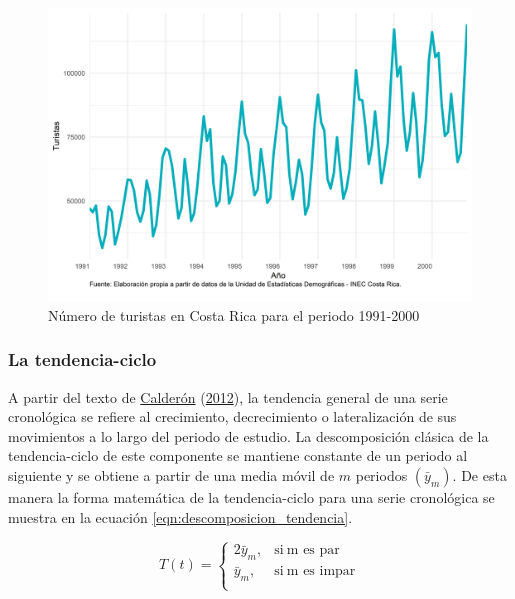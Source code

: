 \documentclass[
]{article}
\begin{document}
\begin{figure}[!h]
\includegraphics[width=1\linewidth,height=1\textheight]{Tesis_files/figure-latex/ejemplo_multiplicativa-1} \caption{Número de turistas en Costa Rica para el periodo 1991-2000}\label{fig:ejemplo_multiplicativa}
\end{figure}

\subsubsection{La tendencia-ciclo}

A partir del texto de
\protect\hyperlink{ref-calderon2012estadistica}{Calderón}
(\protect\hyperlink{ref-calderon2012estadistica}{2012}), la tendencia
general de una serie cronológica se refiere al crecimiento,
decrecimiento o lateralización de sus movimientos a lo largo del periodo
de estudio. La descomposición clásica de la tendencia-ciclo de este
componente se mantiene constante de un periodo al siguiente y se obtiene
a partir de una media móvil de \(m\) periodos
\(\left(\bar y_{m}\right)\). De esta manera la forma matemática de la
tendencia-ciclo para una serie cronológica se muestra en la ecuación
\ref{eqn:descomposicion_tendencia}.

\begin{equation}
\label{eqn:descomposicion_tendencia}
T(t)=
\begin{cases}
2\bar y_{m}, & \text{si}\ \text{m es par} \\
\bar y_{m}, & \text{si}\ \text{m es impar} \\
\end{cases}
\end{equation}
\end{document}
